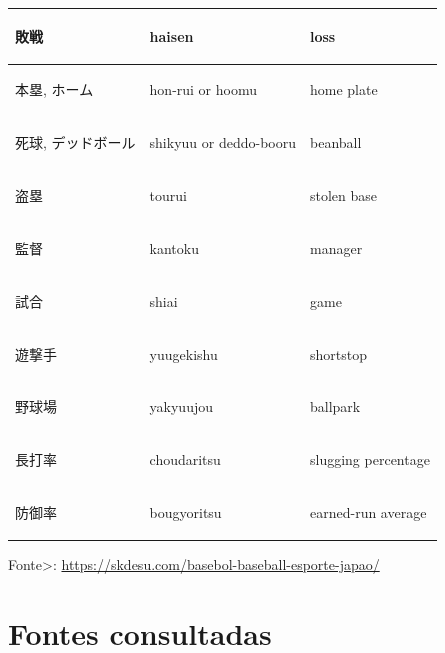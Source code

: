 \begin{table}[!ht]
\begin{center}
\begin{tabular}{lll}
			\begin{CJK}{UTF8}{min}敗戦 \end{CJK} &haisen                          & loss                \\\hline
			\begin{CJK}{UTF8}{min}本塁, ホーム \end{CJK} &hon-rui or hoomu           & home plate          \\\hline
			\begin{CJK}{UTF8}{min}死球, デッドボール \end{CJK} &shikyuu or deddo-booru  & beanball            \\\hline
			\begin{CJK}{UTF8}{min}盗塁 \end{CJK} &tourui                          & stolen base         \\\hline
			\begin{CJK}{UTF8}{min}監督 \end{CJK} &kantoku                         & manager             \\\hline
			\begin{CJK}{UTF8}{min}試合 \end{CJK} &shiai                           & game                \\\hline
			\begin{CJK}{UTF8}{min}遊撃手 \end{CJK} &yuugekishu                     & shortstop           \\\hline
			\begin{CJK}{UTF8}{min}野球場 \end{CJK} &yakyuujou                      & ballpark            \\\hline
			\begin{CJK}{UTF8}{min}長打率 \end{CJK} &choudaritsu                    & slugging percentage \\\hline
			\begin{CJK}{UTF8}{min}防御率 \end{CJK} &bougyoritsu                    & earned-run average 
		\end{tabular}
	\end{center}
	
	\footnotesize{Fonte>: \url{https://skdesu.com/basebol-baseball-esporte-japao/}}
\end{table}

\chapter{Fontes consultadas}


